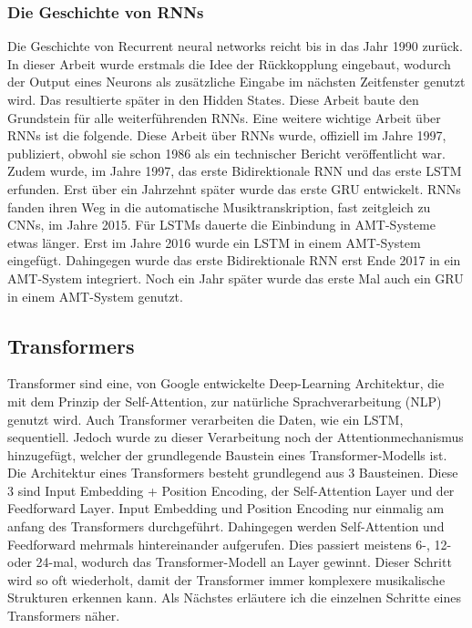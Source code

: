 \subsubsection{Die Geschichte von RNNs}
Die Geschichte von Recurrent neural networks reicht bis in das Jahr 1990 zurück.
\cite{elman1990finding}
In dieser Arbeit wurde erstmals die Idee der Rückkopplung eingebaut,
wodurch der Output eines Neurons als zusätzliche Eingabe im nächsten Zeitfenster genutzt wird.
Das resultierte später in den Hidden States.
Diese Arbeit baute den Grundstein für alle weiterführenden RNNs.
Eine weitere wichtige Arbeit über RNNs ist die folgende.
\cite{jordan1997serial}
Diese Arbeit über RNNs wurde, offiziell im Jahre 1997, publiziert,
obwohl sie schon 1986 als ein technischer Bericht veröffentlicht war.
Zudem wurde, im Jahre 1997, das erste Bidirektionale RNN
\cite{schuster1997bidirectional}
und das erste LSTM erfunden.
\cite{hochreiter1997long}
Erst über ein Jahrzehnt später wurde das erste GRU entwickelt.
\cite{chung2014empirical}
RNNs fanden ihren Weg in die automatische Musiktranskription, fast zeitgleich zu CNNs, im Jahre 2015.
\cite{sigtia2015hybrid}
Für LSTMs dauerte die Einbindung in AMT-Systeme etwas länger.
Erst im Jahre 2016 wurde ein LSTM in einem AMT-System eingefügt.
\cite{sigtia2016end}
Dahingegen wurde das erste Bidirektionale RNN erst Ende 2017 in ein AMT-System integriert.
\cite{hawthorne2017onsets}
Noch ein Jahr später wurde das erste Mal auch ein GRU in einem AMT-System genutzt.
\cite{jung2018adaptive}

\subsection{Transformers}
Transformer sind eine, von Google entwickelte Deep-Learning Architektur,
die mit dem Prinzip der Self-Attention, zur natürliche Sprachverarbeitung (NLP) genutzt wird.
Auch Transformer verarbeiten die Daten, wie ein LSTM, sequentiell.
Jedoch wurde zu dieser Verarbeitung noch der Attentionmechanismus hinzugefügt,
welcher der grundlegende Baustein eines Transformer-Modells ist.
Die Architektur eines Transformers besteht grundlegend aus 3 Bausteinen.
Diese 3 sind Input Embedding + Position Encoding, der Self-Attention Layer und der Feedforward Layer.
Input Embedding und Position Encoding nur einmalig am anfang des Transformers durchgeführt.
Dahingegen werden Self-Attention und Feedforward mehrmals hintereinander aufgerufen.
Dies passiert meistens 6-, 12- oder 24-mal, wodurch das Transformer-Modell an Layer gewinnt.
Dieser Schritt wird so oft wiederholt, damit der Transformer immer komplexere musikalische Strukturen erkennen kann.
Als Nächstes erläutere ich die einzelnen Schritte eines Transformers näher.

